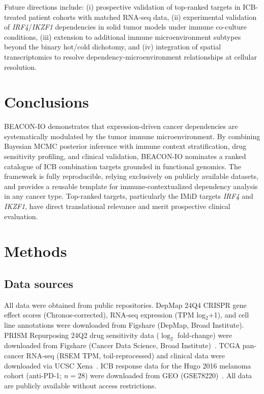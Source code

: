 \documentclass[12pt]{article}
\begin{document}
Future directions include: (i) prospective validation of top-ranked targets in ICB-treated patient cohorts with matched RNA-seq data, (ii) experimental validation of \textit{IRF4}/\textit{IKZF1} dependencies in solid tumor models under immune co-culture conditions, (iii) extension to additional immune microenvironment subtypes beyond the binary hot/cold dichotomy, and (iv) integration of spatial transcriptomics to resolve dependency-microenvironment relationships at cellular resolution.

\section*{Conclusions}

BEACON-IO demonstrates that expression-driven cancer dependencies are systematically modulated by the tumor immune microenvironment. By combining Bayesian MCMC posterior inference with immune context stratification, drug sensitivity profiling, and clinical validation, BEACON-IO nominates a ranked catalogue of ICB combination targets grounded in functional genomics. The framework is fully reproducible, relying exclusively on publicly available datasets, and provides a reusable template for immune-contextualized dependency analysis in any cancer type. Top-ranked targets, particularly the IMiD targets \textit{IRF4} and \textit{IKZF1}, have direct translational relevance and merit prospective clinical evaluation.

\section*{Methods}

\subsection*{Data sources}

All data were obtained from public repositories. DepMap 24Q4 CRISPR gene effect scores (Chronos-corrected), RNA-seq expression (TPM log$_2$+1), and cell line annotations were downloaded from Figshare (DepMap, Broad Institute). PRISM Repurposing 24Q2 drug sensitivity data ($\log_2$ fold-change) were downloaded from Figshare (Cancer Data Science, Broad Institute)~\citep{Corsello2020}. TCGA pan-cancer RNA-seq (RSEM TPM, toil-reprocessed) and clinical data were downloaded via UCSC Xena~\citep{Goldman2020}. ICB response data for the Hugo 2016 melanoma cohort (anti-PD-1; $n = 28$) were downloaded from GEO (GSE78220)~\citep{Hugo2016}. All data are publicly available without access restrictions.
\end{document}
